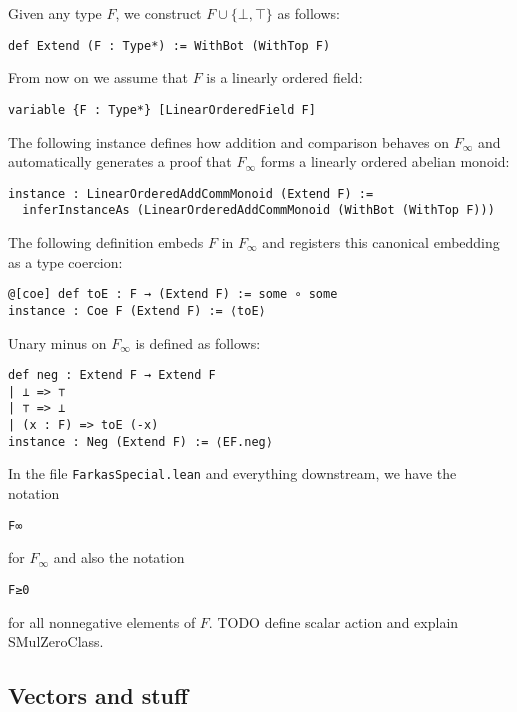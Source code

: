 \documentclass[]{article}
\renewcommand{\.}{\hskip .75pt}
\begin{document}
Given any type $F$, we construct $F \cup \{ \bot, \top \}$ as follows:
\begin{lstlisting}
def Extend (F : Type*) := WithBot (WithTop F)
\end{lstlisting}
From now on we assume that $F$ is a linearly ordered field:
\begin{lstlisting}
variable {F : Type*} [LinearOrderedField F]
\end{lstlisting}
The following instance defines how addition and comparison
behaves on $F_\infty$ and automatically generates a proof
that $F_\infty$ forms a linearly ordered abelian monoid:
\begin{lstlisting}
instance : LinearOrderedAddCommMonoid (Extend F) :=
  inferInstanceAs (LinearOrderedAddCommMonoid (WithBot (WithTop F)))
\end{lstlisting}
The following definition embeds $F$ in $F_\infty$ and registers
this canonical embedding as a type coercion:
\begin{lstlisting}
@[coe] def toE : F → (Extend F) := some ∘ some
instance : Coe F (Extend F) := ⟨toE⟩
\end{lstlisting}
Unary minus on $F_\infty$ is defined as follows:
\begin{lstlisting}
def neg : Extend F → Extend F
| ⊥ => ⊤
| ⊤ => ⊥
| (x : F) => toE (-x)
instance : Neg (Extend F) := ⟨EF.neg⟩
\end{lstlisting}
In the file \texttt{FarkasSpecial.lean} and everything downstream,
we have the notation
\begin{lstlisting}
F∞
\end{lstlisting}
for $F_\infty$ and also the notation
\begin{lstlisting}
F≥0
\end{lstlisting}
for all nonnegative elements of $F$.
TODO define scalar action and explain SMulZeroClass.

\subsection{Vectors and stuff}
\end{document}
